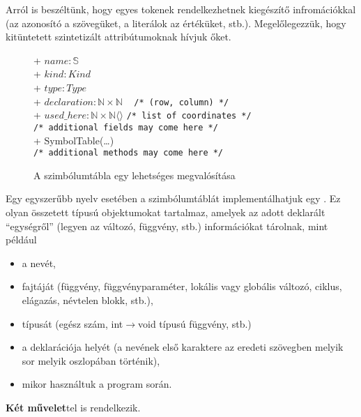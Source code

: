 Arról is beszéltünk, hogy egyes tokenek rendelkezhetnek kiegészítő infromációkkal (az azonosító a szövegüket, a literálok az értéküket, stb.). Megelőlegezzük, hogy {kitüntetett szintetizált attribútumok}nak hívjuk őket.

\begin{figure}
	\centering
	
	
	
	+ $name : \mathbb{S}$ \\
	+ $kind : Kind$ \\
	+ $type : Type$ \\
	+ $declaration : \mathbb{N} \times \mathbb{N}$ ~ \texttt{/* (row, column) */} \\
	+ $used\_here : \mathbb{N} \times \mathbb{N}\langle\rangle$ \texttt{/* list of coordinates */}\\
	\texttt{/* additional fields may come here */} \\
	\hline
	+ SymbolTable(\dots) \\
	\texttt{/* additional methods may come here */} \\
	\eoStruct
	\caption{A szimbólumtábla egy lehetséges megvalósítása}
	\label{symboltabletypedef}
\end{figure}

Egy egyszerűbb nyelv esetében a szimbólumtáblát implementálhatjuk egy . Ez olyan összetett típusú objektumokat tartalmaz, amelyek az adott deklarált ``egységről'' (legyen az változó, függvény, stb.) információkat tárolnak, mint például

\begin{itemize}
	\item a nevét,
	\item fajtáját (függvény, függvényparaméter, lokális vagy globális változó, ciklus, elágazás, névtelen blokk, stb.),
	\item típusát (egész szám, int$\to$void típusú függvény, stb.)
	\item a deklarációja helyét (a nevének első karaktere az eredeti szövegben melyik sor melyik oszlopában történik),
	\item mikor használtuk a program során.
\end{itemize}

\textbf{Két művelet}tel is rendelkezik.

